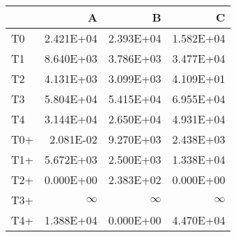\begin{tabular}{lrrr}
\toprule
     &           A &           B &           C \\
\midrule
 T0  &   \num{2.421E+04} &   \num{2.393E+04} &   \num{1.582E+04} \\
 T1  &   \num{8.640E+03} &   \num{3.786E+03} &   \num{3.477E+04} \\
 T2  &   \num{4.131E+03} &   \num{3.099E+03} &   \num{4.109E+01} \\
 T3  &   \num{5.804E+04} &   \num{5.415E+04} &   \num{6.955E+04} \\
 T4  &   \num{3.144E+04} &   \num{2.650E+04} &   \num{4.931E+04} \\
 T0+ &   \num{2.081E-02} &   \num{9.270E+03} &   \num{2.438E+03} \\
 T1+ &   \num{5.672E+03} &   \num{2.500E+03} &   \num{1.338E+04} \\
 T2+ &   \num{0.000E+00} &   \num{2.383E+02} &   \num{0.000E+00} \\
 T3+ &$\infty$        &$\infty$        &$\infty$        \\
 T4+ &   \num{1.388E+04} &   \num{0.000E+00} &   \num{4.470E+04} \\
\bottomrule
\end{tabular}
